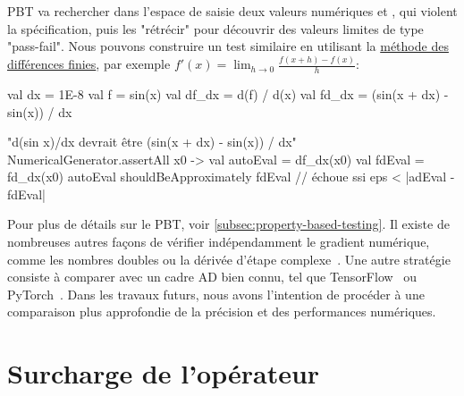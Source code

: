 %
PBT va rechercher dans l'espace de saisie deux valeurs numériques  et , qui violent la spécification, puis les "rétrécir" pour découvrir des valeurs limites de type "pass-fail". Nous pouvons construire un test similaire en utilisant la \hyperref[sec:fdm]{méthode des différences finies}, par exemple $f'(x)=\lim _{h\to 0}{\frac {f(x+h)-f(x)}{h}}$:
%
\begin{kotlinlisting}
val dx = 1E-8
val f = sin(x)
val df_dx = d(f) / d(x)
val fd_dx = (sin(x + dx) - sin(x)) / dx

"d(sin x)/dx devrait être (sin(x + dx) - sin(x)) / dx" {
    NumericalGenerator.assertAll { x0 ->
        val autoEval = df_dx(x0)
        val fdEval = fd_dx(x0)
        autoEval shouldBeApproximately fdEval // échoue ssi eps < |adEval - fdEval|
    }
}
\end{kotlinlisting}
%
Pour plus de détails sur le PBT, voir \autoref{subsec:property-based-testing}. Il existe de nombreuses autres façons de vérifier indépendamment le gradient numérique, comme les nombres doubles ou la dérivée d'étape complexe~\citep{martins2003complex}. Une autre stratégie consiste à comparer avec un cadre AD bien connu, tel que TensorFlow~\citep{abadi2016tensorflow} ou PyTorch~\citep{paszke2019pytorch}. Dans les travaux futurs, nous avons l'intention de procéder à une comparaison plus approfondie de la précision et des performances numériques.

\section{Surcharge de l'opérateur}\label{sec:operator-overloading}

